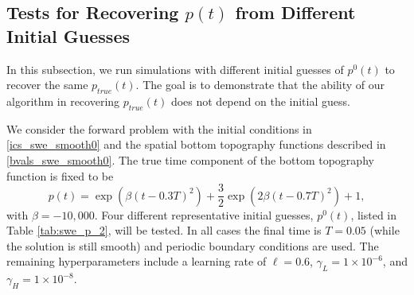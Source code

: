 


\subsection{Tests for Recovering \texorpdfstring{$p(t)$}{p(t)} from Different Initial Guesses} \label{sec_test_swe_2}
In this subsection, we run simulations with different initial guesses of $p^0(t)$ to recover the same $p_{true}(t)$. The goal is to demonstrate that the ability of our algorithm in recovering $p_{true}(t)$ does not depend on the initial guess. 

We consider the forward problem with the initial conditions in \eqref{ics_swe_smooth0} and the spatial bottom topography functions described in \eqref{bvals_swe_smooth0}. The true time component of the bottom topography function is fixed to be 
\begin{equation}\label{pcal_swe_2bumps}
    p(t) = \exp\left(\beta(t-0.3T)^2\right)+\frac{3}{2}\exp\left(2\beta(t-0.7T)^2\right)+1,
\end{equation}
with $\beta = -10,000$. Four different representative initial guesses, $p^0(t)$, listed in Table \ref{tab:swe_p_2}, will be tested. In all cases the final time is $T=0.05$ (while the solution is still smooth) and periodic boundary conditions are used. 
The remaining hyperparameters include a learning rate of $\ell=0.6$, $\gamma_L = 1 \times 10^{-6}$, and $\gamma_H = 1 \times 10^{-8}$.

